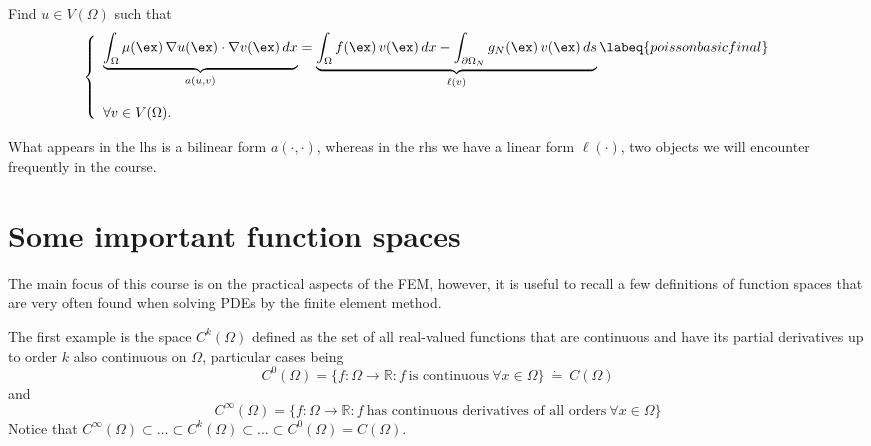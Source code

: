 \begin{kaobox}[frametitle=Weak form of Poisson's problem]
	Find $u \in V(\Omega)$ such that
	\begin{equation}
	\left \{
	\begin{array}{ll}
	\underbrace{\int_{\Omega}{\mu(\ex)\,\nabla{u}(\ex)\cdot \nabla{v}(\ex)}\,dx}_{a(u,v)} =
	\underbrace{\int_{\Omega}{f(\ex)\,v(\ex)}\,dx - \int_{\partial{\Omega}_N}{g_N(\ex) \, v(\ex)}\,ds}_{\ell(v)} \labeq{poissonbasicfinal} & \\
	& \\
	\forall v \in V(\Omega). &
	\end{array}
	\right.
	\end{equation}
\end{kaobox}
What appears in the lhs is a bilinear form $a(\cdot,\cdot)$,
whereas in the rhs we have a linear form
$\ell(\cdot)$, two objects we will encounter frequently
in the course.

\section{Some important function spaces}

The main focus of this course is on the practical 
aspects of the FEM, however, it is useful to recall
a few definitions of function spaces that are 
very often found when solving PDEs by the finite element method.

The first example is the space $C^k(\Omega)$ defined as the set
of all real-valued functions that are continuous and have
its partial derivatives up to order $k$ also continuous
on $\Omega$, particular cases being
\begin{equation}
C^0(\Omega) = \{f: \Omega \rightarrow \mathbb{R} : f~\mbox{is continuous}~\forall x \in \Omega\} ~\dot{=}~ C(\Omega)
\end{equation}
and
\begin{equation}
C^{\infty}(\Omega) = \{f: \Omega \rightarrow \mathbb{R} : f~\mbox{has continuous derivatives of all orders}~\forall x \in \Omega\}
\end{equation}
Notice that $C^{\infty}(\Omega) \subset \dots \subset C^{k}(\Omega) \subset \dots \subset C^{0}(\Omega) = C(\Omega)$.


